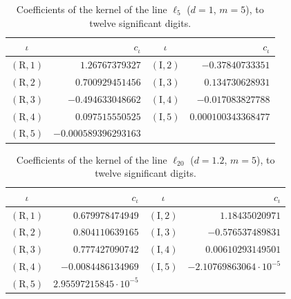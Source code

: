 \documentclass[11pt,reqno]{amsart}
\numberwithin{equation}{section}
\theoremstyle{definition}
\theoremstyle{remark}
\begin{document}
\begin{table}[ht]\caption{The vertices $(\varsigma_i,e_i)$ of the profile $\mathfrak e_{\rm P}$ of Lemma~\ref{lem:profile}, and the source of the bound $\mu(\varsigma_i)\le e_i$. The Heath-Brown vertices $n=10,\dots,398$ are omitted from the table; they are generated by \texttt{profile\_published.py} (Appendix~\ref{app:profile}).}\label{tab:nodes}\end{table}

\begin{table}[ht]\centering\small
\begin{tabular}{@{}cr@{\quad}cr@{}}\toprule $\iota$ & $c_\iota$ & $\iota$ & $c_\iota$\\\midrule
$(\mathrm R,1)$ & $1.26767379327$ & $(\mathrm I,2)$ & $-0.37840733351$\\
$(\mathrm R,2)$ & $0.700929451456$ & $(\mathrm I,3)$ & $0.134730628931$\\
$(\mathrm R,3)$ & $-0.494633048662$ & $(\mathrm I,4)$ & $-0.017083827788$\\
$(\mathrm R,4)$ & $0.097515550525$ & $(\mathrm I,5)$ & $0.000100343368477$\\
$(\mathrm R,5)$ & $-0.000589396293163$ & & \\
\bottomrule\end{tabular}
\caption{Coefficients of the kernel of the line $\ell_{5}$ ($d=1$, $m=5$), to twelve significant digits.}\label{tab:kernel_L5}\end{table}

\begin{table}[ht]\centering\small
\begin{tabular}{@{}cr@{\quad}cr@{}}\toprule $\iota$ & $c_\iota$ & $\iota$ & $c_\iota$\\\midrule
$(\mathrm R,1)$ & $0.679978474949$ & $(\mathrm I,2)$ & $1.18435020971$\\
$(\mathrm R,2)$ & $0.804110639165$ & $(\mathrm I,3)$ & $-0.576537489831$\\
$(\mathrm R,3)$ & $0.777427090742$ & $(\mathrm I,4)$ & $0.00610293149501$\\
$(\mathrm R,4)$ & $-0.0084486134969$ & $(\mathrm I,5)$ & $-2.10769863064\cdot10^{-5}$\\
$(\mathrm R,5)$ & $2.95597215845\cdot10^{-5}$ & & \\
\bottomrule\end{tabular}
\caption{Coefficients of the kernel of the line $\ell_{20}$ ($d=1.2$, $m=5$), to twelve significant digits.}\label{tab:kernel_L20}\end{table}
\end{document}
